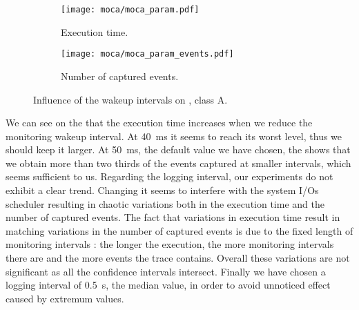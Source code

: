 \begin{figure}[htb]
    \centering
    \begin{subfigure}{.49\linewidth}
        \texttt{[image: moca/moca\_param.pdf]}
        \caption{Execution time.}
        \label{fig:param_time}
    \end{subfigure}
    \begin{subfigure}{.49\linewidth}
        \texttt{[image: moca/moca\_param\_events.pdf]}
        \caption{Number of captured events.}
        \label{fig:param_evts}
    \end{subfigure}
    \caption[Influence of Moca wakeup intervals.]{Influence of the wakeup intervals on \IS, class A.}
    \label{fig:param}
\end{figure}

We can see on the  that the execution time increases when we
reduce the monitoring wakeup interval. At \SI{40}{ms}
it seems to reach its worst level, thus we should keep it larger. At \SI{50}{ms}, the default value we have chosen, the
 shows that we obtain more than two thirds of the events captured
at smaller intervals, which seems sufficient to us.
Regarding the logging interval, our experiments do not exhibit a clear trend. Changing it seems to interfere with the system I/Os scheduler resulting in chaotic
variations both in the execution time and the number of captured events. The fact that variations in execution time result in matching variations in the number
of captured events is due to the fixed length of monitoring intervals : the longer the execution, the more monitoring intervals there are and the more events
the trace contains. Overall these variations are not significant as all the confidence intervals intersect.
Finally we have chosen a logging interval of \SI{0.5}{s}, the median value, in order to avoid unnoticed effect caused by extremum values.

